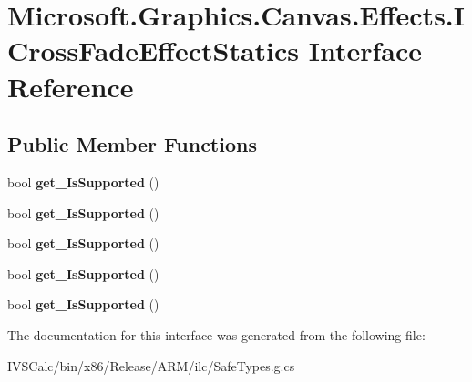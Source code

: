 \hypertarget{interface_microsoft_1_1_graphics_1_1_canvas_1_1_effects_1_1_i_cross_fade_effect_statics}{}\section{Microsoft.\+Graphics.\+Canvas.\+Effects.\+I\+Cross\+Fade\+Effect\+Statics Interface Reference}
\label{interface_microsoft_1_1_graphics_1_1_canvas_1_1_effects_1_1_i_cross_fade_effect_statics}
\subsection*{Public Member Functions}
\begin{DoxyCompactItemize}
\item 
\mbox{\label{interface_microsoft_1_1_graphics_1_1_canvas_1_1_effects_1_1_i_cross_fade_effect_statics_a2456ea7c07a65703e0db3477eb14cc85}} 
bool {\bfseries get\+\_\+\+Is\+Supported} ()
\item 
\mbox{\label{interface_microsoft_1_1_graphics_1_1_canvas_1_1_effects_1_1_i_cross_fade_effect_statics_a2456ea7c07a65703e0db3477eb14cc85}} 
bool {\bfseries get\+\_\+\+Is\+Supported} ()
\item 
\mbox{\label{interface_microsoft_1_1_graphics_1_1_canvas_1_1_effects_1_1_i_cross_fade_effect_statics_a2456ea7c07a65703e0db3477eb14cc85}} 
bool {\bfseries get\+\_\+\+Is\+Supported} ()
\item 
\mbox{\label{interface_microsoft_1_1_graphics_1_1_canvas_1_1_effects_1_1_i_cross_fade_effect_statics_a2456ea7c07a65703e0db3477eb14cc85}} 
bool {\bfseries get\+\_\+\+Is\+Supported} ()
\item 
\mbox{\label{interface_microsoft_1_1_graphics_1_1_canvas_1_1_effects_1_1_i_cross_fade_effect_statics_a2456ea7c07a65703e0db3477eb14cc85}} 
bool {\bfseries get\+\_\+\+Is\+Supported} ()
\end{DoxyCompactItemize}


The documentation for this interface was generated from the following file\+:\begin{DoxyCompactItemize}
\item 
I\+V\+S\+Calc/bin/x86/\+Release/\+A\+R\+M/ilc/Safe\+Types.\+g.\+cs\end{DoxyCompactItemize}
